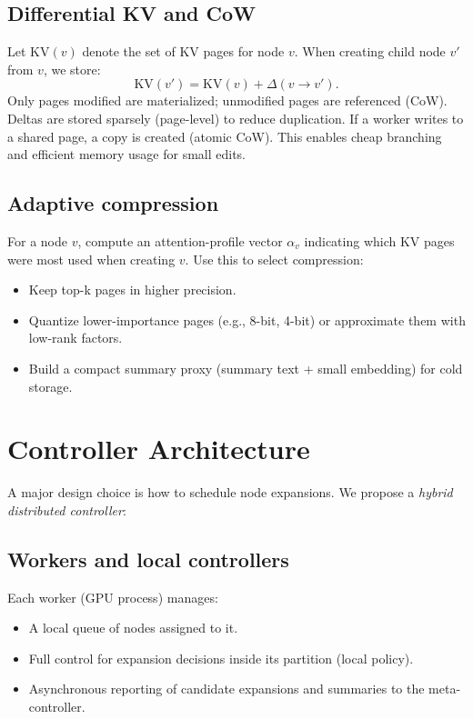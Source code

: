 \documentclass[11pt,onecolumn,letterpaper]{article}
\begin{document}
\subsection{Differential KV and CoW}
Let \(\text{KV}(v)\) denote the set of KV pages for node \(v\). When creating child node \(v'\) from \(v\), we store:
\[
\text{KV}(v') = \text{KV}(v) + \Delta(v\to v').
\]
Only pages modified are materialized; unmodified pages are referenced (CoW). Deltas are stored sparsely (page-level) to reduce duplication. If a worker writes to a shared page, a copy is created (atomic CoW). This enables cheap branching and efficient memory usage for small edits.

\subsection{Adaptive compression}
For a node \(v\), compute an attention-profile vector \(\alpha_v\) indicating which KV pages were most used when creating \(v\). Use this to select compression:
\begin{itemize}[nosep]
  \item Keep top-k pages in higher precision.
  \item Quantize lower-importance pages (e.g., 8-bit, 4-bit) or approximate them with low-rank factors.
  \item Build a compact summary proxy (summary text + small embedding) for cold storage.
\end{itemize}

\section{Controller Architecture}
A major design choice is how to schedule node expansions. We propose a \emph{hybrid distributed controller}:

\subsection{Workers and local controllers}
Each worker (GPU process) manages:
\begin{itemize}[nosep]
  \item A local queue of nodes assigned to it.
  \item Full control for expansion decisions inside its partition (local policy).
  \item Asynchronous reporting of candidate expansions and summaries to the meta-controller.
\end{itemize}
\end{document}
